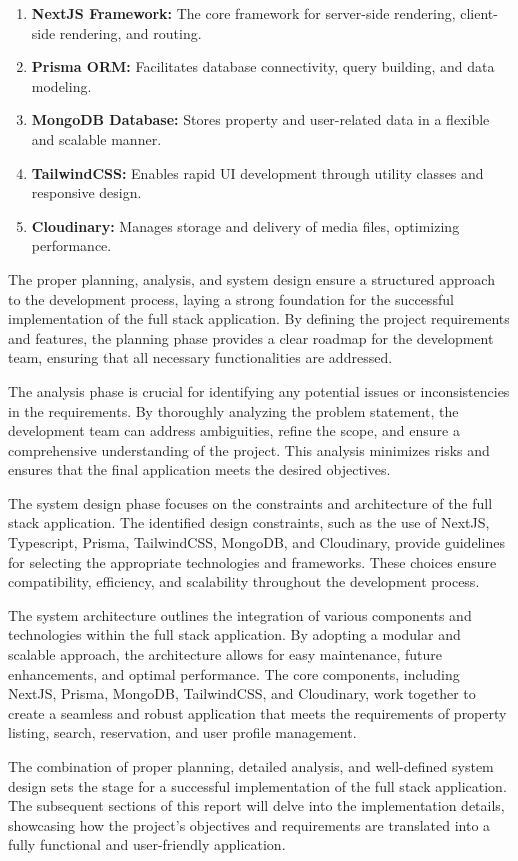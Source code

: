 \begin{enumerate}
	\item \textbf{NextJS Framework:} The core framework for server-side rendering, client-side rendering, and routing.
	\item \textbf{Prisma ORM:} Facilitates database connectivity, query building, and data modeling.
	\item \textbf{MongoDB Database:} Stores property and user-related data in a flexible and scalable manner.
	\item \textbf{TailwindCSS:} Enables rapid UI development through utility classes and responsive design.
	\item \textbf{Cloudinary:} Manages storage and delivery of media files, optimizing performance.
\end{enumerate}

The proper planning, analysis, and system design ensure a structured approach to the development process, laying a strong foundation for the successful implementation of the full stack application. By defining the project requirements and features, the planning phase provides a clear roadmap for the development team, ensuring that all necessary functionalities are addressed.

The analysis phase is crucial for identifying any potential issues or inconsistencies in the requirements. By thoroughly analyzing the problem statement, the development team can address ambiguities, refine the scope, and ensure a comprehensive understanding of the project. This analysis minimizes risks and ensures that the final application meets the desired objectives.

The system design phase focuses on the constraints and architecture of the full stack application. The identified design constraints, such as the use of NextJS, Typescript, Prisma, TailwindCSS, MongoDB, and Cloudinary, provide guidelines for selecting the appropriate technologies and frameworks. These choices ensure compatibility, efficiency, and scalability throughout the development process.

The system architecture outlines the integration of various components and technologies within the full stack application. By adopting a modular and scalable approach, the architecture allows for easy maintenance, future enhancements, and optimal performance. The core components, including NextJS, Prisma, MongoDB, TailwindCSS, and Cloudinary, work together to create a seamless and robust application that meets the requirements of property listing, search, reservation, and user profile management.

The combination of proper planning, detailed analysis, and well-defined system design sets the stage for a successful implementation of the full stack application. The subsequent sections of this report will delve into the implementation details, showcasing how the project's objectives and requirements are translated into a fully functional and user-friendly application.